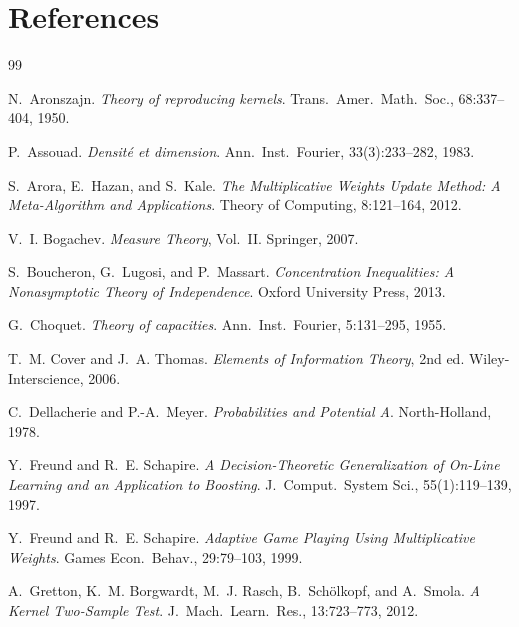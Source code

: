 \chapter*{References}\label{chap:references}

\begin{thebibliography}{99}

N.~Aronszajn.
\newblock \emph{Theory of reproducing kernels}.
\newblock Trans.\ Amer.\ Math.\ Soc., 68:337--404, 1950.

P.~Assouad.
\newblock \emph{Densit\'e et dimension}.
\newblock Ann.\ Inst.\ Fourier, 33(3):233--282, 1983.

S.~Arora, E.~Hazan, and S.~Kale.
\newblock \emph{The Multiplicative Weights Update Method: A Meta-Algorithm and Applications}.
\newblock Theory of Computing, 8:121--164, 2012.

V.~I. Bogachev.
\newblock \emph{Measure Theory}, Vol.\ II.
\newblock Springer, 2007.

S.~Boucheron, G.~Lugosi, and P.~Massart.
\newblock \emph{Concentration Inequalities: A Nonasymptotic Theory of Independence}.
\newblock Oxford University Press, 2013.

G.~Choquet.
\newblock \emph{Theory of capacities}.
\newblock Ann.\ Inst.\ Fourier, 5:131--295, 1955.

T.~M. Cover and J.~A. Thomas.
\newblock \emph{Elements of Information Theory}, 2nd ed.
\newblock Wiley-Interscience, 2006.

C.~Dellacherie and P.-A.\ Meyer.
\newblock \emph{Probabilities and Potential A}.
\newblock North-Holland, 1978.

Y.~Freund and R.~E. Schapire.
\newblock \emph{A Decision-Theoretic Generalization of On-Line Learning and an Application to Boosting}.
\newblock J.\ Comput.\ System Sci., 55(1):119--139, 1997.

Y.~Freund and R.~E. Schapire.
\newblock \emph{Adaptive Game Playing Using Multiplicative Weights}.
\newblock Games Econ.\ Behav., 29:79--103, 1999.

A.~Gretton, K.~M. Borgwardt, M.~J. Rasch, B.~Sch\"olkopf, and A.~Smola.
\newblock \emph{A Kernel Two-Sample Test}.
\newblock J.\ Mach.\ Learn.\ Res., 13:723--773, 2012.


\end{thebibliography}
